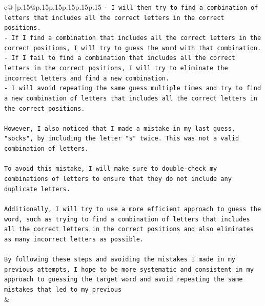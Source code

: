 \documentclass{article}
\begin{document}
{\begin{supertabular}{c@{$\;$}|p{.15\linewidth}@{}p{.15\linewidth}p{.15\linewidth}p{.15\linewidth}p{.15\linewidth}p{.15\linewidth}}
{{{\texttt{{-} I will then try to find a combination of letters that includes all the correct letters in the correct positions.} \\
\texttt{{-} If I find a combination that includes all the correct letters in the correct positions, I will try to guess the word with that combination.} \\
\texttt{{-} If I fail to find a combination that includes all the correct letters in the correct positions, I will try to eliminate the incorrect letters and find a new combination.} \\
\texttt{{-} I will avoid repeating the same guess multiple times and try to find a new combination of letters that includes all the correct letters in the correct positions.} \\
\\ 
\texttt{However, I also noticed that I made a mistake in my last guess, "socks", by including the letter "s" twice. This was not a valid combination of letters. } \\
\\ 
\texttt{To avoid this mistake, I will make sure to double{-}check my combinations of letters to ensure that they do not include any duplicate letters. } \\
\\ 
\texttt{Additionally, I will try to use a more efficient approach to guess the word, such as trying to find a combination of letters that includes all the correct letters in the correct positions and also eliminates as many incorrect letters as possible. } \\
\\ 
\texttt{By following these steps and avoiding the mistakes I made in my previous attempts, I hope to be more systematic and consistent in my approach to guessing the target word and avoid repeating the same mistakes that led to my previous} \\
            }
        }
    }
    & \\ \\

\end{supertabular}
}
\end{document}
